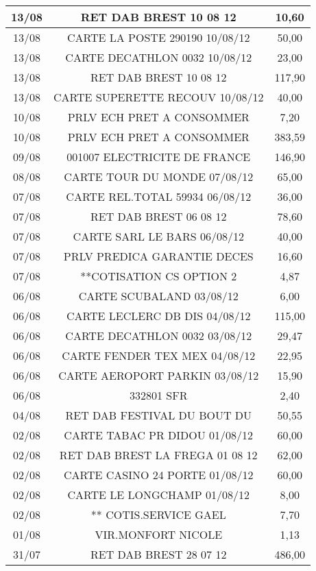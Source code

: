 \begin{longtable}{|c|c|c|}
\hline
13/08 & RET DAB BREST          10 08 12 & 10,60 \\
\hline
13/08 & CARTE LA POSTE 290190  10/08/12 & 50,00 \\
\hline
13/08 & CARTE DECATHLON 0032   10/08/12 & 23,00 \\
\hline
13/08 & RET DAB BREST          10 08 12 & 117,90 \\
\hline
13/08 & CARTE SUPERETTE RECOUV 10/08/12 & 40,00 \\
\hline
10/08 & PRLV ECH PRET A CONSOMMER & 7,20 \\
\hline
10/08 & PRLV ECH PRET A CONSOMMER & 383,59 \\
\hline
09/08 & 001007 ELECTRICITE DE FRANCE & 146,90 \\
\hline
08/08 & CARTE TOUR DU MONDE    07/08/12 & 65,00 \\
\hline
07/08 & CARTE REL.TOTAL 59934  06/08/12 & 36,00 \\
\hline
07/08 & RET DAB BREST          06 08 12 & 78,60 \\
\hline
07/08 & CARTE SARL LE BARS     06/08/12 & 40,00 \\
\hline
07/08 & PRLV   PREDICA GARANTIE DECES & 16,60 \\
\hline
07/08 & **COTISATION CS OPTION 2 & 4,87 \\
\hline
06/08 & CARTE SCUBALAND        03/08/12 & 6,00 \\
\hline
06/08 & CARTE LECLERC DB DIS   04/08/12 & 115,00 \\
\hline
06/08 & CARTE DECATHLON 0032   03/08/12 & 29,47 \\
\hline
06/08 & CARTE FENDER TEX MEX   04/08/12 & 22,95 \\
\hline
06/08 & CARTE AEROPORT PARKIN  03/08/12 & 15,90 \\
\hline
06/08 & 332801 SFR & 2,40 \\
\hline
04/08 & RET DAB FESTIVAL DU BOUT DU & 50,55 \\
\hline
02/08 & CARTE TABAC PR DIDOU   01/08/12 & 60,00 \\
\hline
02/08 & RET DAB BREST LA FREGA 01 08 12 & 62,00 \\
\hline
02/08 & CARTE CASINO 24 PORTE  01/08/12 & 60,00 \\
\hline
02/08 & CARTE LE LONGCHAMP     01/08/12 & 8,00 \\
\hline
02/08 & ** COTIS.SERVICE GAEL & 7,70 \\
\hline
01/08 & VIR.MONFORT NICOLE & 1,13 \\
\hline
31/07 & RET DAB BREST          28 07 12 & 486,00 \\
\hline
\end{longtable}
